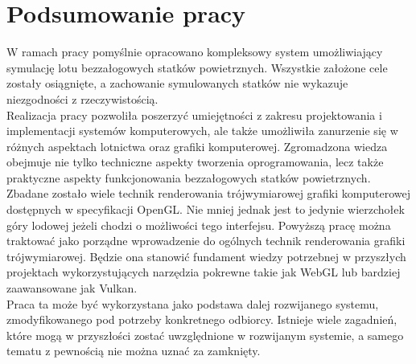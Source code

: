 \chapter{Podsumowanie pracy}


W ramach pracy pomyślnie opracowano kompleksowy system umożliwiający symulację lotu bezzałogowych statków powietrznych. Wszystkie założone cele zostały osiągnięte, a zachowanie symulowanych statków nie wykazuje niezgodności z rzeczywistością.\\

Realizacja pracy pozwoliła poszerzyć umiejętności z zakresu projektowania i implementacji systemów komputerowych, ale także umożliwiła zanurzenie się w różnych aspektach lotnictwa oraz grafiki komputerowej. Zgromadzona wiedza obejmuje nie tylko techniczne aspekty tworzenia oprogramowania, lecz także praktyczne aspekty funkcjonowania bezzałogowych statków powietrznych.\\

Zbadane zostało wiele technik renderowania trójwymiarowej grafiki komputerowej dostępnych w specyfikacji OpenGL. Nie mniej jednak jest to jedynie wierzchołek góry lodowej jeżeli chodzi o możliwości tego interfejsu. Powyższą pracę można traktować jako porządne wprowadzenie do ogólnych technik renderowania grafiki trójwymiarowej. Będzie ona stanowić fundament wiedzy potrzebnej w przyszłych projektach wykorzystujących narzędzia pokrewne takie jak WebGL lub bardziej zaawansowane jak Vulkan. \\

Praca ta może być wykorzystana jako podstawa dalej rozwijanego systemu, zmodyfikowanego pod potrzeby konkretnego odbiorcy. Istnieje wiele zagadnień, które mogą w przyszłości zostać uwzględnione w rozwijanym systemie, a samego tematu z pewnością nie można uznać za zamknięty.